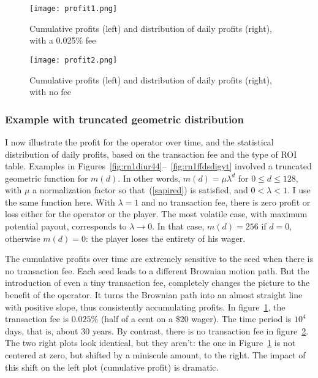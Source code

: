 \documentclass[oneside,10pt]{book}
\begin{document}
\begin{figure}[H]
\centering
\texttt{[image: profit1.png]}
\caption{Cumulative profits (left) and distribution of daily profits (right), with a 0.025\% fee}
\label{fig:rn1dqprf1}
\end{figure}

\begin{figure}[H]
\centering
\texttt{[image: profit2.png]}
\caption{Cumulative profits (left) and distribution of daily profits (right), with no fee}
\label{fig:rn1dqprf2}
\end{figure}

\subsubsection{Example with truncated geometric distribution}

I now illustrate the profit for the operator over time, and the statistical distribution of daily profits, based on the
 transaction fee and the type of ROI table. Examples in Figures~\ref{fig:rn1diur44}--~\ref{fig:rn1ffdsdigyt} involved a truncated geometric function
 for $m(d)$. In other words, $m(d) = \mu \lambda^d$ for $0\leq d \leq 128$, with $\mu$ a normalization factor so
that~(\ref{sapired}) is satisfied, and $0<\lambda < 1$. I use the same function here. With $\lambda = 1$ and no transaction fee, there is zero profit or loss either for the operator or the player. The most volatile case, with maximum potential payout,
 corresponds to $\lambda\rightarrow 0$. In that case, $m(d)=256$ if $d=0$, otherwise $m(d)=0$: the player loses the entirety of
his wager.

The cumulative profits over time are extremely sensitive to the seed when there is no transaction fee. Each seed leads to a
 different \textcolor{index}{Brownian motion} path. But the introduction of even a tiny transaction fee, completely changes the picture to the benefit
 of the operator. It turns the Brownian path into an almost straight line with positive slope, thus consistently accumulating profits.
In figure~\ref{fig:rn1dqprf1}, the transaction fee is $0.025\%$ (half of a cent on a \$20 wager). The time period is
 $10^4$ days, that is, about 30 years. By contrast, there is no transaction fee in figure~\ref{fig:rn1dqprf2}.
The two right plots look identical, but they aren't: the one in Figure~\ref{fig:rn1dqprf1} is not centered at zero, but shifted by a miniscule amount, to the right. The impact of this shift on the left plot (cumulative profit) is dramatic.
\end{document}
